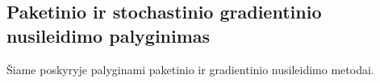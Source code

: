 \subsection{Paketinio ir stochastinio gradientinio nusileidimo palyginimas}
\label{subsec:bgd_vs_sgd}

Šiame poskyryje palyginami paketinio ir gradientinio nusileidimo metodai.


